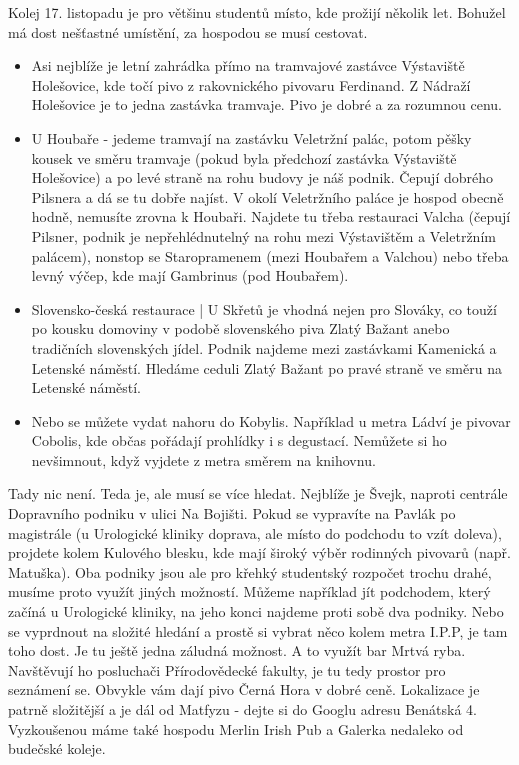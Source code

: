 Kolej 17. listopadu je pro většinu studentů místo, kde prožijí několik let.
Bohužel má dost nešťastné umístění, za hospodou se musí cestovat.
\begin{itemize}
\item Asi nejblíže je letní zahrádka přímo na tramvajové zastávce Výstaviště
Holešovice, kde točí pivo z rakovnického pivovaru Ferdinand. Z Nádraží
Holešovice je to jedna zastávka tramvaje. Pivo je dobré a za rozumnou cenu.
\item U Houbaře - jedeme tramvají na zastávku Veletržní palác, potom pěšky
kousek ve směru tramvaje (pokud byla předchozí zastávka Výstaviště Holešovice) a
po levé straně na rohu budovy je náš podnik. Čepují dobrého Pilsnera a dá se tu
dobře najíst. V okolí Veletržního paláce je hospod obecně hodně, nemusíte zrovna
k Houbaři. Najdete tu třeba restauraci Valcha (čepují Pilsner, podnik je
nepřehlédnutelný na rohu mezi Výstavištěm a Veletržním palácem), nonstop se
Staropramenem (mezi Houbařem a Valchou) nebo třeba levný výčep, kde mají
Gambrinus (pod Houbařem).
\item Slovensko-česká restaurace | U Skřetů je vhodná nejen pro Slováky, co
touží po kousku domoviny v podobě slovenského piva Zlatý Bažant anebo tradičních
slovenských jídel. Podnik najdeme mezi zastávkami Kamenická a Letenské náměstí.
Hledáme ceduli Zlatý Bažant po pravé straně ve směru na Letenské náměstí.
\item Nebo se můžete vydat nahoru do Kobylis. Například u metra Ládví je pivovar
Cobolis, kde občas pořádají prohlídky i s degustací. Nemůžete si ho nevšimnout,
když vyjdete z metra směrem na knihovnu.
\end{itemize}

Tady nic není. Teda je, ale musí se více hledat. Nejblíže je Švejk, naproti
centrále Dopravního podniku v ulici Na Bojišti. Pokud se vypravíte na Pavlák po
magistrále (u Urologické kliniky doprava, ale místo do podchodu to vzít doleva),
projdete kolem Kulového blesku, kde mají široký výběr rodinných pivovarů (např.
Matuška). Oba podniky jsou ale pro křehký studentský rozpočet trochu drahé,
musíme proto využít jiných možností. Můžeme například jít podchodem, který
začíná u Urologické kliniky, na jeho konci najdeme proti sobě dva podniky. Nebo
se vyprdnout na složité hledání a prostě si vybrat něco kolem metra I.P.P, je
tam toho dost. Je tu ještě jedna záludná možnost. A to využít bar Mrtvá ryba.
Navštěvují ho posluchači Přírodovědecké fakulty, je tu tedy prostor pro
seznámení se. Obvykle vám dají pivo Černá Hora v dobré ceně. Lokalizace je
patrně složitější a je dál od Matfyzu - dejte si do Googlu adresu Benátská 4.
Vyzkoušenou máme také hospodu Merlin Irish Pub a Galerka nedaleko od budečské
koleje.

